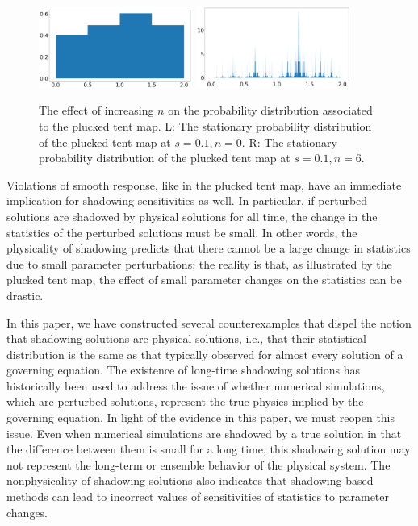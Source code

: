 \begin{figure}
    \centering
    \includegraphics[width=0.45\textwidth]{osc_tent_dens_0.1_0.png}
    \includegraphics[width=0.45\textwidth]{osc_tent_dens_0.5_6.png}
    \caption{The effect of increasing $n$ on the probability distribution associated to the plucked tent map. L: The stationary probability distribution of the plucked tent map at $s=0.1, n = 0$. R: The stationary probability distribution of the plucked tent map at $s=0.1, n = 6$.}
    \label{fig:pluckedTentMapDistribution}
\end{figure}
Violations of smooth response, like in the plucked tent map, have an immediate implication for shadowing sensitivities as well. In particular, if perturbed solutions are shadowed by physical solutions for all time, the change in the statistics of the perturbed solutions must be small. In other words, the physicality of shadowing predicts that there cannot be a large change in statistics due to small parameter perturbations; the reality is that, as illustrated by the plucked tent map, the effect of small parameter changes on the statistics can be drastic.  


In this paper, we have constructed several counterexamples that 
dispel the notion that shadowing solutions are physical solutions, i.e., that their 
statistical distribution is the same as that typically observed for almost every solution 
of a governing equation. The existence of long-time shadowing solutions \cite{grebogi} has historically been used to address the issue of whether numerical simulations, which are 
perturbed solutions, represent the true physics implied by the governing equation. In light of the evidence in this paper, we must reopen this issue. Even when numerical simulations are 
shadowed by a true solution in that the difference between them is small for a long time, this shadowing solution may not represent the long-term or ensemble behavior of the physical system. The nonphysicality of shadowing solutions also indicates that shadowing-based methods \cite{qiqi-lss} can lead to incorrect values of sensitivities of statistics to parameter changes. 



